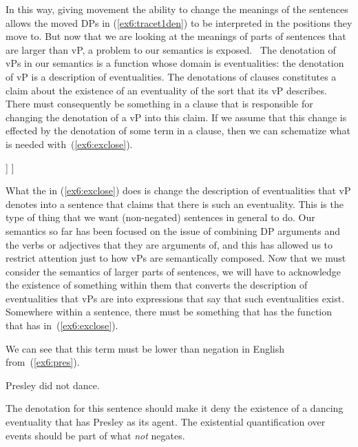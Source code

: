 In this way, giving movement the ability to change the meanings of the sentences allows the moved DPs in (\ref{ex6:tracet1den}) to be interpreted in the positions they move to. But now that we are looking at the meanings of parts of sentences that are larger than vP, a problem to our semantics is exposed.%
%
%
%
\ The denotation of vPs in our semantics is a function whose domain is eventualities: the denotation of vP is a description of eventualities. The denotations of clauses constitutes a claim about the existence of an eventuality of the sort that its vP describes. There must consequently be something in a clause that is responsible for changing the denotation of a vP into this claim. If we assume that this change is effected by the denotation of some term in a clause, then we can schematize what is needed with~(\ref{ex6:exclose}).
\begin{exe}
\raggedright
	\ex \label{ex6:exclose}
	\small
	\begin{forest}
	[$\exists \epsilon'$ \textsc{dance}($\epsilon'$) $\wedge$ \textsc{agent}(\denotes{Presley})($\epsilon'$) \\XP
		[$\lambda P\ \exists \epsilon'\ P(\epsilon')$\\ \obar{X} ]
		[$\lambda \epsilon$ \textsc{dance}($\epsilon$) $\wedge$ \textsc{agent}(\denotes{Presley}($\epsilon$)) \\vP [Presley dance, roof] ]
	]
	\end{forest}
\end{exe}
What the  in (\ref{ex6:exclose}) does is change the description of eventualities that vP denotes into a sentence that claims that there is such an eventuality. This is the type of thing that we want (non-negated) sentences in general to do. Our semantics so far has been focused on the issue of combining DP arguments and the verbs or adjectives that they are arguments of, and this has allowed us to restrict attention just to how vPs are semantically composed. Now that we must consider the semantics of larger parts of sentences, we will have to acknowledge the existence of something within them that converts the description of eventualities that vPs are into expressions that say that such eventualities exist. Somewhere within a sentence, there must be something that has the function that  has in~(\ref{ex6:exclose}).

We can see that this term must be lower than negation in English from~(\ref{ex6:pres}).
\begin{exe}
\raggedright
	\ex \label{ex6:pres}
	Presley did not dance.
\end{exe}
The denotation for this sentence should make it deny the existence of a dancing eventuality that has Presley as its agent. The existential quantification over events should be part of what \emph{not} negates.

